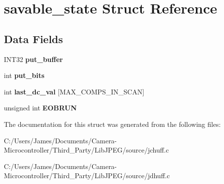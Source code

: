 \hypertarget{structsavable__state}{}\section{savable\+\_\+state Struct Reference}
\label{structsavable__state}
\subsection*{Data Fields}
\begin{DoxyCompactItemize}
\item 
\mbox{\label{structsavable__state_aa49a0d5bf7c21597d9ae84323b0772a9}} 
I\+N\+T32 {\bfseries put\+\_\+buffer}
\item 
\mbox{\label{structsavable__state_a6fbf63c183427b0eebfedeb4194c1479}} 
int {\bfseries put\+\_\+bits}
\item 
\mbox{\label{structsavable__state_a4512a7188359961a566b95da00a00bdf}} 
int {\bfseries last\+\_\+dc\+\_\+val} \mbox{[}M\+A\+X\+\_\+\+C\+O\+M\+P\+S\+\_\+\+I\+N\+\_\+\+S\+C\+AN\mbox{]}
\item 
\mbox{\label{structsavable__state_a1637ef6c8a3a9c72246e984bbb2fa16b}} 
unsigned int {\bfseries E\+O\+B\+R\+UN}
\end{DoxyCompactItemize}


The documentation for this struct was generated from the following files\+:\begin{DoxyCompactItemize}
\item 
C\+:/\+Users/\+James/\+Documents/\+Camera-\/\+Microcontroller/\+Third\+\_\+\+Party/\+Lib\+J\+P\+E\+G/source/jchuff.\+c\item 
C\+:/\+Users/\+James/\+Documents/\+Camera-\/\+Microcontroller/\+Third\+\_\+\+Party/\+Lib\+J\+P\+E\+G/source/jdhuff.\+c\end{DoxyCompactItemize}
